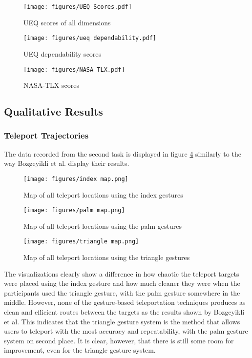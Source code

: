 \begin{figure}[!ht]
    \centering
    \texttt{[image: figures/UEQ Scores.pdf]}
    \caption{UEQ scores of all dimensions}
    \label{fig:ueqDimensions}
\end{figure}

\begin{figure}[!ht]
    \centering
    \texttt{[image: figures/ueq dependability.pdf]}
    \caption{UEQ dependability scores}
    \label{fig:ueqDependability}
\end{figure}

\begin{figure}[!ht]
    \centering
    \texttt{[image: figures/NASA-TLX.pdf]}
    \caption{NASA-TLX scores}
    \label{fig:ueqDependability}
\end{figure}


\subsection{Qualitative Results}

\subsubsection{Teleport Trajectories}
The data recorded from the second task is displayed in figure \ref{fig:exp2maps} similarly to the way Bozgeyikli et al. %
display their results. 

\begin{figure}[!htb]
        \texttt{[image: figures/index map.png]}
        \caption{Map of all teleport locations using the index gestures}\label{fig:map_index}
    \endminipage\hfill
        \texttt{[image: figures/palm map.png]}
        \caption{Map of all teleport locations using the palm gestures}\label{fig:map_palm}
    \endminipage\hfill
        \texttt{[image: figures/triangle map.png]}
        \caption{Map of all teleport locations using the triangle gestures}\label{fig:map_triangle}
        \label{fig:exp2maps}
    \endminipage
\end{figure}
    
The visualizations clearly show a difference in how chaotic the teleport targets were placed using the index gesture and how much cleaner they were when the participants used the triangle gesture, with the palm gesture somewhere in the middle. However, none of the gesture-based teleportation techniques produces as clean and efficient routes between the targets as the results shown by Bozgeyikli et al. This indicates that the triangle gesture system is the method that allows users to teleport with the most accuracy and repeatability, with the palm gesture system on second place. It is clear, however, that there is still some room for improvement, even for the triangle gesture system. 


